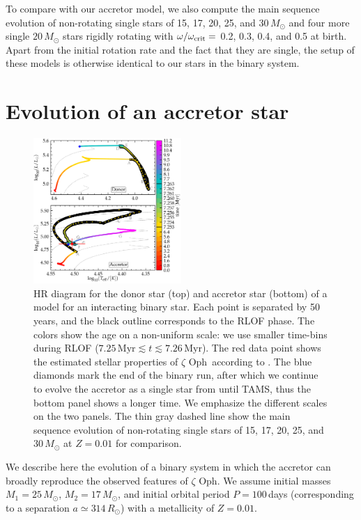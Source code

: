\documentclass[twocolumn,twocolappendix,trackchanges]{aastex63}
\newcommand{\zoph}{$\zeta$ Oph}
\begin{document}
To compare with our accretor model, we also compute the main sequence
evolution of non-rotating single stars of 15, 17, 20, 25, and
30$\,M_\odot$ and four more single $20\,M_\odot$ stars rigidly rotating with
$\omega/\omega _{\rm crit} = $ 0.2, 0.3, 0.4, and 0.5 at birth. Apart
from the initial rotation rate and the fact that they are single, the
setup of these models is otherwise identical to our stars in the binary system.


\section{Evolution of an accretor star}
\label{sec:best_model}

\begin{figure}[htbp]
  \includegraphics[width=0.5\textwidth]{HRD_colored}
  \caption{HR diagram for the donor star (top) and accretor star
    (bottom) of a model for an interacting binary star. Each point is
    separated by 50\,years, and the black outline corresponds to the
    RLOF phase. The colors show the age on a non-uniform scale: we use
    smaller time-bins during RLOF
    ($7.25\,\mathrm{Myr}\lesssim t \lesssim 7.26\,\mathrm{Myr}$).  The
    red data point shows the estimated stellar properties of \zoph\ according to
    . The blue diamonds mark the end of
    the binary run, after which we continue to evolve the accretor as a single
    star from until TAMS, thus the bottom panel
    shows a longer time. We emphasize the different scales on the two
    panels. The thin gray dashed line show the main sequence evolution
    of non-rotating single stars of 15, 17, 20, 25, and 30\,$M_\odot$
    at $Z=0.01$ for comparison.}
  \label{fig:HRD_both}
\end{figure}


We describe here the evolution of a binary system in which the
accretor can broadly reproduce the observed features of \zoph. We
assume initial masses $M_1=25\,M_\odot$, $M_2=17\,M_\odot$, and initial orbital
period $P=100$\,days (corresponding to a separation
$a\simeq314\,R_\odot$) with a metallicity of $Z=0.01$.
\end{document}
